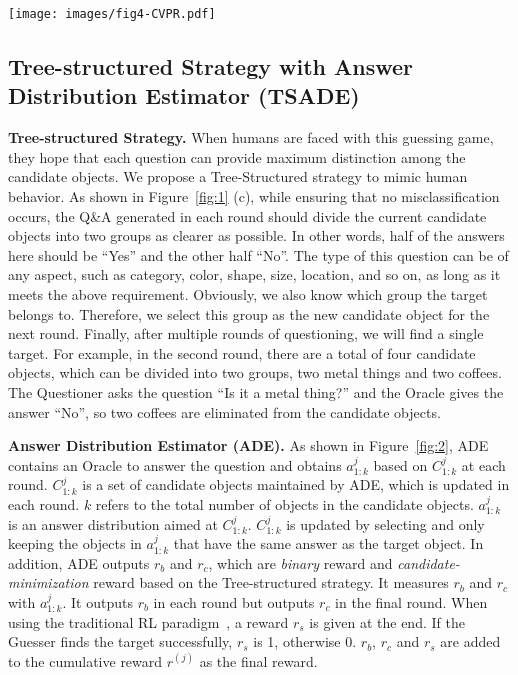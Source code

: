 \begin{figure*}[htbp]
  \centering
  \texttt{[image: images/fig4-CVPR.pdf]}
  \caption{The framework of the Tree-structured Strategy with Answer Distribution Estimator (TSADE). The red box represents the target object.}
  \label{fig:2}
\end{figure*}

\subsection{Tree-structured Strategy with Answer Distribution Estimator (TSADE)}


\textbf{Tree-structured Strategy.} When humans are faced with this guessing game, they hope that each question can provide maximum distinction among the candidate objects. We propose a Tree-Structured strategy to mimic human behavior. As shown in Figure~\ref{fig:1} (c), while ensuring that no misclassification occurs, the Q\&A generated in each round should divide the current candidate objects into two groups as clearer as possible. In other words, half of the answers here should be ``Yes'' and the other half ``No''. The type of this question can be of any aspect, such as category, color, shape, size, location, and so on, as long as it meets the above requirement. Obviously, we also know which group the target belongs to. Therefore, we select this group as the new candidate object for the next round. 
Finally, after multiple rounds of questioning, we will find a single target. For example, in the second round, there are a total of four candidate objects, which can be divided into two groups, two metal things and two coffees. The Questioner asks the question ``Is it a metal thing?'' and the Oracle gives the answer ``No'', so two coffees are eliminated from the candidate objects. 


\textbf{Answer Distribution Estimator (ADE).} As shown in Figure~\ref{fig:2}, ADE contains an Oracle to answer the question and obtains $a_{1:k}^{j}$ based on $C_{1:k}^{j}$ at each round. $C_{1:k}^{j}$ is a set of candidate objects maintained by ADE, which is updated in each round. $k$ refers to the total number of objects in the candidate objects. $a_{1:k}^{j}$ is an answer distribution aimed at $C_{1:k}^{j}$. $C_{1:k}^{j}$ is updated by selecting and only keeping the objects in $a_{1:k}^{j}$ that have the same answer as the target object. In addition, ADE outputs $r_b$ and $r_c$, which are \emph{binary} reward and \emph{candidate-minimization} reward based on the Tree-structured strategy. It measures $r_b$ and $r_c$ with $a_{1:k}^{j}$. It outputs $r_b$ in each round but outputs $r_c$ in the final round. When using the traditional RL paradigm~\cite{strub2017end}, a reward $r_s$ is given at the end. If the Guesser finds the target successfully, $r_s$ is 1, otherwise 0. $r_b$, $r_c$ and $r_s$ are added to the cumulative reward $r^{\left( j \right)}$ as the final reward.




